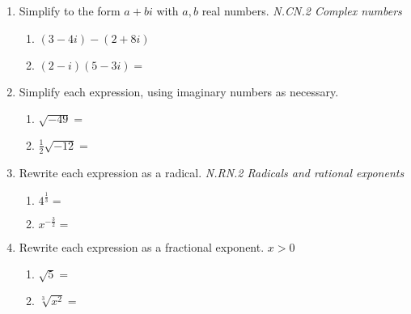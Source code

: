 \documentclass[12pt, twoside]{article}
\begin{document}
\begin{enumerate}[itemsep=0.5cm]
\item Simplify to the form $a+bi$ with $a,b$ real numbers. \hfill \emph{N.CN.2 Complex numbers}
    \begin{multicols}{2}
        \begin{enumerate}[itemsep=1.5cm]
            \item $(3 - 4i) - (2 + 8i)$
            \item $(2 - i)(5 - 3i)=$
        \end{enumerate}
    \end{multicols}  \vspace{5cm}

\item Simplify each expression, using imaginary numbers as necessary.
    \begin{multicols}{2}
    \begin{enumerate}[itemsep=0.5cm]
        \item $\sqrt{-49}=$
        \item $\displaystyle \frac{1}{2} \sqrt{-12}=$
    \end{enumerate}
    \end{multicols} \vspace{1cm}
  
\item Rewrite each expression as a radical. \hfill \emph{N.RN.2 Radicals and rational exponents} \vspace{0.25cm}
    \begin{multicols}{2}
      \begin{enumerate}[itemsep=1cm]
        \item $\displaystyle 4^{\frac{1}{3}}=$
        \item $\displaystyle x^{-\frac{3}{2}}=$
      \end{enumerate}
      \end{multicols} \vspace{1cm}
      
\item Rewrite each expression as a fractional exponent. $x>0$  \vspace{0.25cm}
    \begin{multicols}{2}
      \begin{enumerate}[itemsep=1cm]
          \item $\sqrt{5} =$
          \item $\sqrt[3]{x^2} =$
      \end{enumerate}
      \end{multicols}

       
\end{enumerate}
\end{document}
